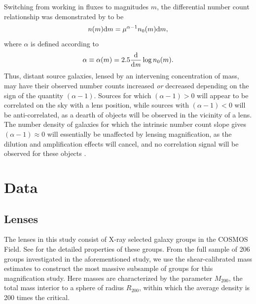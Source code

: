 Switching from working in fluxes to magnitudes $m$, the differential number count relationship was demonstrated by \citet{Narayan89} to be
\begin{equation}
n(m){\rm d}m = \mu ^{\alpha -1} n_0 (m){\rm d}m,
\end{equation}
where $\alpha$ is defined according to
\begin{equation}
\alpha \equiv \alpha(m) = 2.5 \frac{\mathrm d}{\mathrm d \it m} \log n_0(m).
\end{equation}
Thus, distant source galaxies, lensed by an intervening concentration of mass, may have their observed number counts increased {\it or} decreased depending on the sign of the quantity $(\alpha -1)$. Sources for which $(\alpha -1) > 0$ will appear to be correlated on the sky with a lens position, while sources with $(\alpha -1) < 0$ will be anti-correlated, as a dearth of objects will be observed in the vicinity of a lens. The number density of galaxies for which the intrinsic number count slope gives $(\alpha -1) \approx 0$ will essentially be unaffected by lensing magnification, as the dilution and amplification effects will cancel, and no correlation signal will be observed for these objects \citep{Scranton05}.

\section{Data}
\label{sec:data2}
\subsection{Lenses}
The lenses in this study consist of X-ray selected galaxy groups in the \ac{COSMOS} Field.  See \citet{Leauthaud10} for the detailed properties of these groups.  From the full sample of 206 groups investigated in the aforementioned study, we use the shear-calibrated mass estimates to construct the most massive subsample of groups for this magnification study. Here masses are characterized by the parameter $M_{200}$, the total mass interior to a sphere of radius $R_{200}$, within which the average density is 200 times the critical. 

